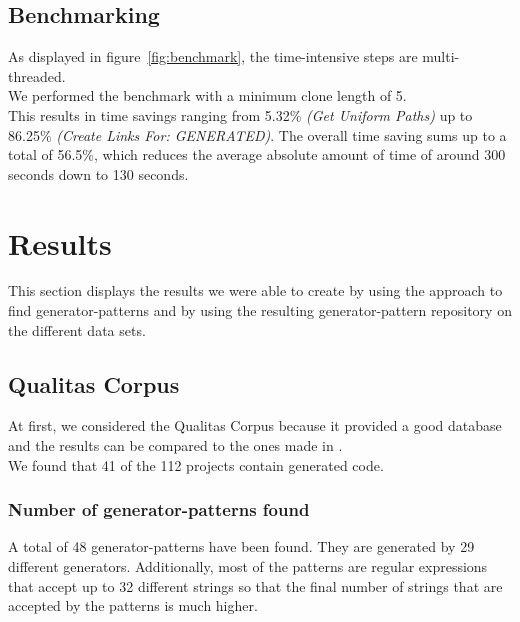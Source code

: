 \subsection{Benchmarking}
\label{section:benchmark}
As displayed in figure~\ref{fig:benchmark}, the time-intensive steps are multi-threaded.\\
We performed the benchmark with a minimum clone length of 5.\\
This results in time savings ranging from 5.32\% \textit{(Get Uniform Paths)} up to 86.25\% \textit{(Create Links For: GENERATED)}. The overall time saving sums up to a total of 56.5\%, which reduces the average absolute amount of time of around 300 seconds down to 130 seconds. 



\section{Results}
This section displays the results we were able to create by using the approach to find generator-patterns and by using the resulting generator-pattern repository on the different data sets. 
\subsection{Qualitas Corpus}
At first, we considered the Qualitas Corpus because it provided a good database and the results can be compared to the ones made in \cite{Bernwieser2014}.\\
We found that 41 of the 112 projects contain generated code. 

\subsubsection{Number of generator-patterns found}
A total of 48 generator-patterns have been found. They are generated by 29 different generators. Additionally, most of the patterns are regular expressions that accept up to 32 different strings so that the final number of strings that are accepted by the patterns is much higher.

%

